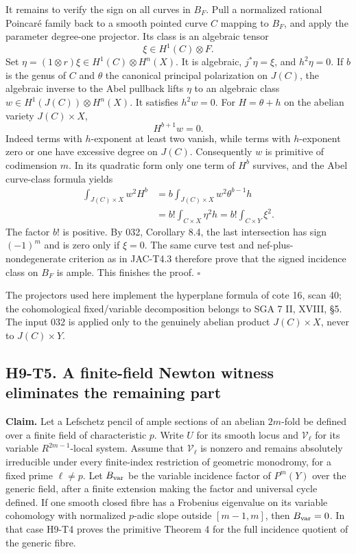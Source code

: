 It remains to verify the sign on all curves in $B_F$. Pull a normalized
rational Poincar\'e family back to a smooth pointed curve $C$ mapping to
$B_F$, and apply the parameter degree-one projector. Its class is an
algebraic tensor
\[
 \xi\in H^1(C)\otimes F.
\]
Set $\eta=(1\otimes r)\xi\in H^1(C)\otimes H^n(X)$.
It is algebraic, $j^*\eta=\xi$, and $h^2\eta=0$.
If $b$ is the genus of $C$ and $\theta$ the canonical principal
polarization on $J(C)$, the algebraic inverse to the Abel pullback
lifts $\eta$ to an algebraic class
$w\in H^1(J(C))\otimes H^n(X)$. It satisfies $h^2w=0$.
For $H=\theta+h$ on the abelian variety $J(C)\times X$,
\[
 H^{b+1}w=0.
\]
Indeed terms with $h$-exponent at least two vanish, while terms with
$h$-exponent zero or one have excessive degree on $J(C)$.
Consequently $w$ is primitive of codimension $m$. In its quadratic form
only one term of $H^b$ survives, and the Abel curve-class formula yields
\[
 \begin{aligned}
 \int_{J(C)\times X}w^2H^b
 &=b\int_{J(C)\times X}w^2\theta^{b-1}h\\
 &=b!\int_{C\times X}\eta^2h
 =b!\int_{C\times Y}\xi^2.
 \end{aligned}                                                \tag{H9.9}
\]
The factor $b!$ is positive. By 032, Corollary 8.4, the last intersection
has sign $(-1)^m$ and is zero only if $\xi=0$. The same curve test and
nef-plus-nondegenerate criterion as in JAC-T4.3 therefore prove that
the signed incidence class on $B_F$ is ample. This finishes the proof.
\hfill$\square$

The projectors used here implement the hyperplane formula of cote 16,
scan 40; the cohomological fixed/variable decomposition belongs to
SGA 7 II, XVIII, \S5. The input 032 is applied only to the genuinely
abelian product $J(C)\times X$, never to $J(C)\times Y$.

\subsection*{H9-T5. A finite-field Newton witness eliminates the remaining part}

\textbf{Claim.} Let a Lefschetz pencil of ample sections of an abelian
$2m$-fold be defined over a finite field of characteristic $p$. Write
$U$ for its smooth locus and $\mathcal V_\ell$ for its variable
$R^{2m-1}$-local system. Assume that $\mathcal V_\ell$ is nonzero and
remains absolutely irreducible under every finite-index restriction of
geometric monodromy, for a fixed prime $\ell\ne p$. Let
$B_{\rm var}$ be the variable incidence factor of $P^m(Y)$ over the
generic field, after a finite extension making the factor and universal
cycle defined. If one smooth closed fibre has a Frobenius eigenvalue on
its variable cohomology with normalized $p$-adic slope outside
$[m-1,m]$, then $B_{\rm var}=0$. In that case H9-T4 proves the primitive
Theorem 4 for the full incidence quotient of the generic fibre.

